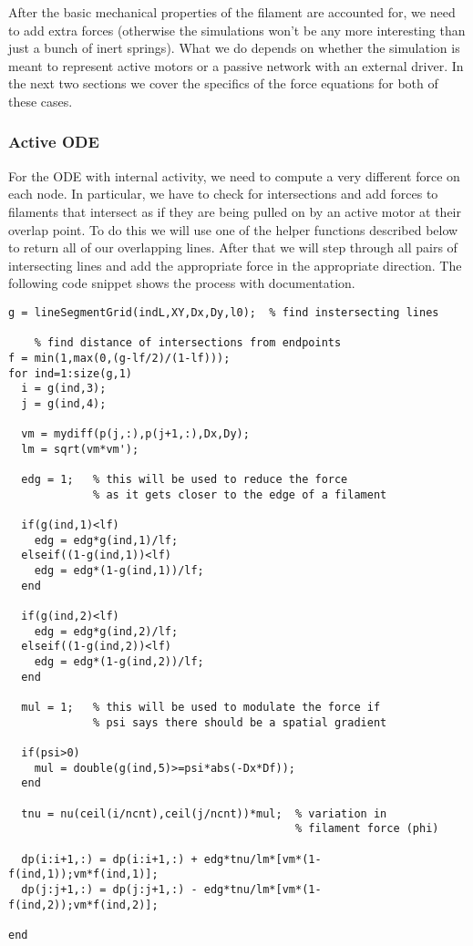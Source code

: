 After the basic mechanical properties of the filament are accounted for, we need to add extra forces (otherwise the simulations won't be any more interesting than just a bunch of inert springs).  What we do depends on whether the simulation is meant to represent active motors or a passive network with an external driver.  In the next two sections we cover the specifics of the force equations for both of these cases.

\subsubsection{Active ODE}

For the ODE with internal activity, we need to compute a very different force on each node.  In particular, we have to check for intersections and add forces to filaments that intersect as if they are being pulled on by an active motor at their overlap point.  To do this we will use one of the helper functions described below to return all of our overlapping lines.  After that we will step through all pairs of intersecting lines and add the appropriate force in the appropriate direction.  The following code snippet shows the process with documentation.  

\begin{verbatim}
g = lineSegmentGrid(indL,XY,Dx,Dy,l0);  % find instersecting lines

	% find distance of intersections from endpoints
f = min(1,max(0,(g-lf/2)/(1-lf)));     
for ind=1:size(g,1)
  i = g(ind,3);
  j = g(ind,4);

  vm = mydiff(p(j,:),p(j+1,:),Dx,Dy);
  lm = sqrt(vm*vm');

  edg = 1;   % this will be used to reduce the force 
			 % as it gets closer to the edge of a filament

  if(g(ind,1)<lf)
    edg = edg*g(ind,1)/lf;
  elseif((1-g(ind,1))<lf)
    edg = edg*(1-g(ind,1))/lf;
  end

  if(g(ind,2)<lf)
    edg = edg*g(ind,2)/lf;
  elseif((1-g(ind,2))<lf)
    edg = edg*(1-g(ind,2))/lf;
  end
  
  mul = 1;   % this will be used to modulate the force if
             % psi says there should be a spatial gradient
  
  if(psi>0)
    mul = double(g(ind,5)>=psi*abs(-Dx*Df));
  end
  
  tnu = nu(ceil(i/ncnt),ceil(j/ncnt))*mul;  % variation in 
											% filament force (phi)
  
  dp(i:i+1,:) = dp(i:i+1,:) + edg*tnu/lm*[vm*(1-f(ind,1));vm*f(ind,1)];
  dp(j:j+1,:) = dp(j:j+1,:) - edg*tnu/lm*[vm*(1-f(ind,2));vm*f(ind,2)];

end
\end{verbatim}

